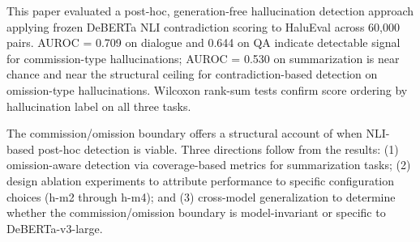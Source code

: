 
This paper evaluated a post-hoc, generation-free hallucination detection approach applying frozen DeBERTa NLI contradiction scoring to HaluEval across 60,000 pairs. AUROC = 0.709 on dialogue and 0.644 on QA indicate detectable signal for commission-type hallucinations; AUROC = 0.530 on summarization is near chance and near the structural ceiling for contradiction-based detection on omission-type hallucinations. Wilcoxon rank-sum tests confirm score ordering by hallucination label on all three tasks.

The commission/omission boundary offers a structural account of when NLI-based post-hoc detection is viable. Three directions follow from the results: (1) omission-aware detection via coverage-based metrics for summarization tasks; (2) design ablation experiments to attribute performance to specific configuration choices (h-m2 through h-m4); and (3) cross-model generalization to determine whether the commission/omission boundary is model-invariant or specific to DeBERTa-v3-large.
